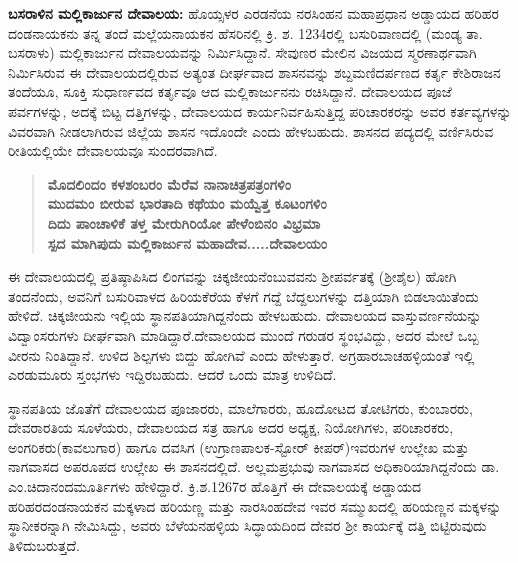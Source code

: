 \textbf{ಬಸರಾಳಿನ ಮಲ್ಲಿಕಾರ್ಜುನ ದೇವಾಲಯ:} ಹೊಯ್ಸಳರ ಎರಡನೆಯ ನರಸಿಂಹನ ಮಹಾಪ್ರಧಾನ ಅಡ್ಡಾಯದ ಹರಿಹರ ದಂಡನಾಯಕನು ತನ್ನ ತಂದೆ ಮಲ್ಲೆಯನಾಯಕನ ಹೆಸರಿನಲ್ಲಿ ಕ್ರಿ. ಶ. 1234ರಲ್ಲಿ ಬಸುರಿವಾಣದಲ್ಲಿ (ಮಂಡ್ಯ ತಾ. ಬಸರಾಳು) ಮಲ್ಲಿಕಾರ್ಜುನ ದೇವಾಲಯವನ್ನು ನಿರ್ಮಿಸಿದ್ದಾನೆ. ಸೇವುಣರ ಮೇಲಿನ ವಿಜಯದ ಸ್ಮರಣಾರ್ಥವಾಗಿ ನಿರ್ಮಿಸಿರುವ ಈ ದೇವಾಲಯದಲ್ಲಿರುವ ಅತ್ಯಂತ ದೀರ್ಘವಾದ ಶಾಸನವನ್ನು ಶಬ್ದಮಣಿದರ್ಪಣದ ಕರ್ತೃ ಕೇಶಿರಾಜನ ತಂದೆಯೂ, ಸೂಕ್ತಿ ಸುಧಾರ್ಣವದ ಕರ್ತೃವೂ ಆದ ಮಲ್ಲಿಕಾರ್ಜುನನು ರಚಿಸಿದ್ದಾನೆ. ದೇವಾಲಯದ ಪೂಜೆ ಪರ್ವಗಳನ್ನು, ಅದಕ್ಕೆ ಬಿಟ್ಟ ದತ್ತಿಗಳನ್ನು, ದೇವಾಲಯದ ಕಾರ್ಯನಿರ್ವಹಿಸುತ್ತಿದ್ದ ಪರಿಚಾರಕರನ್ನು ಅವರ ಕರ್ತವ್ಯಗಳನ್ನು ವಿವರವಾಗಿ ನೀಡಲಾಗಿರುವ ಜಿಲ್ಲೆಯ ಶಾಸನ ಇದೊಂದೇ ಎಂದು ಹೇಳಬಹುದು. ಶಾಸನದ ಪದ್ಯದಲ್ಲಿ ವರ್ಣಿಸಿರುವ ರೀತಿಯಲ್ಲಿಯೇ ದೇವಾಲಯವೂ ಸುಂದರವಾಗಿದೆ.

\begin{verse}
\textbf{ಮೊದಲಿಂದಂ ಕಳಶಂಬರಂ ಮೆರೆವ ನಾನಾಚಿತ್ರಪತ್ರಂಗಳಿಂ} \\\textbf{ಮುದಮಂ ಬೀರುವ ಭಾರತಾದಿ ಕಥೆಯಂ ಮಯ್ವೆತ್ತ ಕೂಟಂಗಳಿಂ} \\\textbf{ದಿದು ಪಾಂಚಾಳಿಕೆ ತಳ್ತ ಮೇರುಗಿರಿಯೋ ಪೇಳೆಂಬಿನಂ ವಿಭ್ರಮಾ} \\\textbf{ಸ್ಪದ ಮಾಗಿಪುದು ಮಲ್ಲಿಕಾರ್ಜುನ ಮಹಾದೇವ.....ದೇವಾಲಯಂ}
\end{verse}

ಈ ದೇವಾಲಯದಲ್ಲಿ ಪ್ರತಿಷ್ಠಾಪಿಸಿದ ಲಿಂಗವನ್ನು ಚಿಕ್ಕಜೀಯನೆಂಬುವವನು ಶ‍್ರೀಪರ್ವತಕ್ಕೆ (ಶ‍್ರೀಶೈಲ) ಹೋಗಿ ತಂದನೆಂದು, ಅವನಿಗೆ ಬಸುರಿವಾಳದ ಹಿರಿಯಕೆರೆಯ ಕೆಳಗೆ ಗದ್ದೆ ಬೆದ್ದಲುಗಳನ್ನು ದತ್ತಿಯಾಗಿ ಬಿಡಲಾಯಿತೆಂದು ಹೇಳಿದೆ. ಚಿಕ್ಕಜೀಯನು ಇಲ್ಲಿಯ ಸ್ಥಾನಪತಿಯಾಗಿದ್ದನೆಂದು ಹೇಳಬಹುದು. ದೇವಾಲಯದ ವಾಸ್ತುವರ್ಣನೆಯನ್ನು ವಿದ್ವಾಂಸರುಗಳು ದೀರ್ಘವಾಗಿ ಮಾಡಿದ್ದಾರೆ.ದೇವಾಲಯದ ಮುಂದೆ ಗರುಡರ ಸ್ಥಂಭವಿದ್ದು, ಅದರ ಮೇಲೆ ಒಬ್ಬ ವೀರನು ನಿಂತಿದ್ದಾನೆ. ಉಳಿದ ಶಿಲ್ಪಗಳು ಬಿದ್ದು ಹೋಗಿವೆ ಎಂದು ಹೇಳುತ್ತಾರೆ. ಅಗ್ರಹಾರಬಾಚಹಳ್ಳಿಯಂತೆ ಇಲ್ಲಿ ಎರಡುಮೂರು ಸ್ತಂಭಗಳು ಇದ್ದಿರಬಹುದು. ಆದರೆ ಒಂದು ಮಾತ್ರ ಉಳಿದಿದೆ.

ಸ್ಥಾನಪತಿಯ ಜೊತೆಗೆ ದೇವಾಲಯದ ಪೂಜಾರರು, ಮಾಲೆಗಾರರು, ಹೂದೋಟದ ತೋಟಿಗರು, ಕುಂಬಾರರು, ದೇವರಾರತಿಯ ಸೂಳೆಯರು, ದೇವಾಲಯದ ಸತ್ರ ಹಾಗೂ ಅದರ ಅಧ್ಯಕ್ಷ, ನಿಯೋಗಿಗಳು, ಪರಿಚಾರಕರು, ಅಂಗರಿ\-ಕರು(ಕಾವಲುಗಾರ) ಹಾಗೂ ದವಸಿಗ (ಉಗ್ರಾಣಪಾಲಕ-ಸ್ಟೋರ್​ ಕೀಪರ್​)ಇವರುಗಳ ಉಲ್ಲೇಖ ಮತ್ತು ನಾಗವಾಸದ ಅಪರೂಪದ ಉಲ್ಲೇಖ ಈ ಶಾಸನದಲ್ಲಿದೆ. ಅಲ್ಲಮಪ್ರಭುವು ನಾಗವಾಸದ ಅಧಿಕಾರಿಯಾಗಿದ್ದನೆಂದು ಡಾ. ಎಂ.ಚಿದಾನಂದ\-ಮೂರ್ತಿಗಳು ಹೇಳಿದ್ದಾರೆ. ಕ್ರಿ.ಶ.1267ರ ಹೊತ್ತಿಗೆ ಈ ದೇವಾಲಯಕ್ಕೆ ಅಡ್ಡಾಯದ ಹರಿಹರದಂಡನಾಯಕನ ಮಕ್ಕಳಾದ ಹರಿಯಣ್ಣ ಮತ್ತು ನಾರಸಿಂಹದೇವ ಇವರ ಸಮ್ಮುಖದಲ್ಲಿ ಹರಿಯಣ್ಣನ ಮಕ್ಕಳನ್ನು ಸ್ಥಾನೀಕರನ್ನಾಗಿ ನೇಮಿಸಿದ್ದು, ಅವರು ಬೆಳೆಯನಹಳ್ಳಿಯ ಸಿದ್ಧಾಯದಿಂದ ದೇವರ ಶ‍್ರೀ ಕಾರ್ಯಕ್ಕೆ ದತ್ತಿ ಬಿಟ್ಟಿರುವುದು ತಿಳಿದುಬರುತ್ತದೆ.

